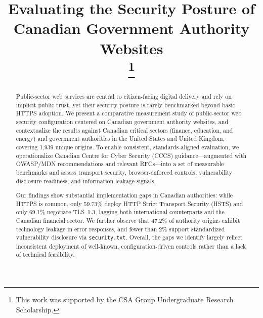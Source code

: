 \documentclass[conference]{IEEEtran}
\begin{document}
\title{Evaluating the Security Posture of Canadian Government Authority Websites\\
\thanks{This work was supported by the CSA Group Undergraduate Research Scholarship.}
}


\author{
\and
{}
}

\maketitle

\begin{abstract}
  
  Public-sector web services are central to citizen-facing digital delivery and rely on implicit public trust, yet their security posture is rarely benchmarked beyond basic HTTPS adoption. We present a comparative measurement study of public-sector web security configuration centered on Canadian government authority websites, and contextualize the results against Canadian critical sectors (finance, education, and energy) and government authorities in the United States and United Kingdom, covering 1{,}939 unique origins. 
  To enable consistent, standards-aligned evaluation, we operationalize Canadian Centre for Cyber Security (CCCS) guidance---augmented with OWASP/MDN recommendations and relevant RFCs---into a set of measurable benchmarks and assess transport security, browser-enforced controls, vulnerability disclosure readiness, and information leakage signals.
  
  Our findings show substantial implementation gaps in Canadian authorities: while HTTPS is common, only 59.73\% deploy HTTP Strict Transport Security (HSTS) and only 69.1\% negotiate TLS~1.3, lagging both international counterparts and the Canadian financial sector. We further observe that 47.2\% of authority origins exhibit technology leakage in error responses, and fewer than 2\% support standardized vulnerability disclosure via \texttt{security.txt}. Overall, the gaps we identify largely reflect inconsistent deployment of well-known, configuration-driven controls rather than a lack of technical feasibility.

\end{abstract}
\end{document}
